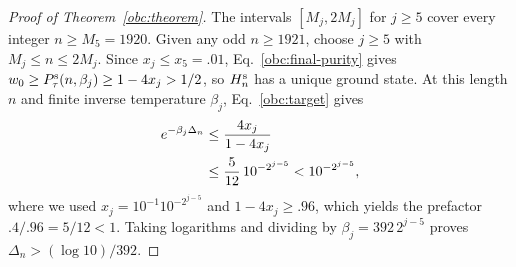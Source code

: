 \begin{proof}[Proof of Theorem~\ref{obc:theorem}]
The intervals $[M_j,2M_j]$ for $j\ge5$ cover every integer
$n\ge M_5=1920$. Given any odd $n\ge1921$, choose $j\ge5$ with $M_j\le n\le2M_j$.
Since $x_j\le x_5=.01$, Eq.~\eqref{obc:final-purity} gives
$w_0\ge P_{\tau}^{\mathrm{s}}(n,\beta_j)\ge1-4x_j>1/2$, so $H_n^{\mathrm{s}}$ has a unique ground state. At this
length $n$ and finite inverse temperature $\beta_j$,
Eq.~\eqref{obc:target} gives
\begin{align}
 e^{-\beta_j\Delta_n}
 &\le\frac{4x_j}{1-4x_j}\notag \\
 &\le\frac{5}{12}\,10^{-2^{j-5}}
 <10^{-2^{j-5}},
 \label{obc:gap-final}
\end{align}
where we used $x_j=10^{-1}10^{-2^{j-5}}$ and
$1-4x_j\ge.96$, which yields the prefactor $.4/.96=5/12<1$.
Taking logarithms and dividing by $\beta_j=392\,2^{j-5}$ proves
$\Delta_n>(\log 10)/392$.
\end{proof}
